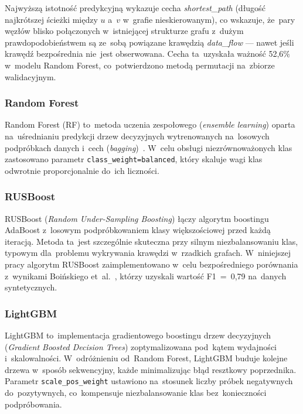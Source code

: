 Najwyższą istotność predykcyjną wykazuje cecha \emph{shortest\_path}
(długość najkrótszej ścieżki między $u$ a~$v$ w~grafie nieskierowanym),
co wskazuje, że~pary węzłów blisko połączonych w~istniejącej strukturze
grafu z~dużym prawdopodobieństwem są ze~sobą powiązane krawędzią
\emph{data\_flow} — nawet jeśli krawędź bezpośrednia nie~jest
obserwowana. Cecha ta~uzyskała ważność 52{,}6\% w~modelu Random Forest,
co~potwierdzono metodą permutacji na~zbiorze walidacyjnym.

\subsubsection{Random Forest}

Random Forest (RF) to~metoda uczenia zespołowego (\emph{ensemble
learning}) oparta na~uśrednianiu predykcji drzew decyzyjnych
wytrenowanych na~losowych podpróbkach danych i~cech
(\emph{bagging})~\cite{LibenNowell2007}. W~celu obsługi
niezrównoważonych klas zastosowano parametr
\texttt{class\_weight=\textquotedbl{}balanced\textquotedbl{}},
który skaluje wagi klas odwrotnie proporcjonalnie do~ich liczności.

\subsubsection{RUSBoost}

RUSBoost (\emph{Random Under-Sampling Boosting}) łączy algorytm
boostingu AdaBoost z~losowym podpróbkowaniem klasy większościowej
przed każdą iteracją. Metoda ta~jest szczególnie skuteczna przy silnym
niezbalansowaniu klas, typowym dla~problemu wykrywania krawędzi
w~rzadkich grafach. W~niniejszej pracy algorytm RUSBoost zaimplementowano
w~celu bezpośredniego porównania z~wynikami Boińskiego
et~al.~\cite{Boinski2025}, którzy uzyskali wartość F1~=~0{,}79
na~danych syntetycznych.

\subsubsection{LightGBM}

LightGBM to~implementacja gradientowego boostingu drzew decyzyjnych
(\emph{Gradient Boosted Decision Trees}) zoptymalizowana pod~kątem
wydajności i~skalowalności. W~odróżnieniu od~Random Forest, LightGBM
buduje kolejne drzewa w~sposób sekwencyjny, każde minimalizując błąd
resztkowy poprzednika. Parametr \texttt{scale\_pos\_weight} ustawiono
na~stosunek liczby próbek negatywnych do~pozytywnych, co~kompensuje
niezbalansowanie klas bez~konieczności podpróbowania.

